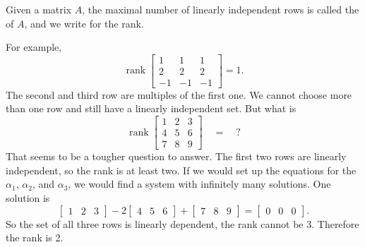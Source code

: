 \begin{definition}
Given a matrix $A$, the maximal number of linearly independent rows is called
the \emph{} of $A$, and we write
 for the rank.
\end{definition}
For example,
\begin{equation*}
\operatorname{rank}
\begin{bmatrix}
1 & 1 & 1 \\
2 & 2 & 2 \\
-1 & -1 & -1
\end{bmatrix}
=
1 .
\end{equation*}
The second and third
row are multiples of the first one.  We cannot choose more than one row and
still have a linearly independent set.   But what is
\begin{equation*}
\operatorname{rank}
\begin{bmatrix}
1 & 2 & 3 \\
4 & 5 & 6 \\
7 & 8 & 9
\end{bmatrix} \quad = \quad ?
\end{equation*}
That seems to be a tougher question to answer.  The
first two rows are linearly independent, so the rank is at least
two.  If we would set up the equations for the $\alpha_1$, $\alpha_2$, and
$\alpha_3$, we would find a system with infinitely many solutions.  One
solution is
\begin{equation*}
\begin{bmatrix}
1 & 2 & 3
\end{bmatrix} -2
\begin{bmatrix}
4 & 5 & 6 
\end{bmatrix} +
\begin{bmatrix}
7 & 8 & 9
\end{bmatrix} =
\begin{bmatrix}
0 & 0 & 0
\end{bmatrix} .
\end{equation*}
So the set of all three rows is linearly dependent, the rank cannot be
3.  Therefore the rank is 2.

